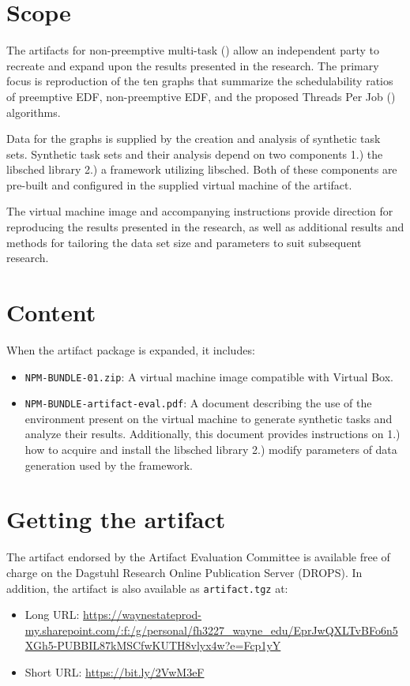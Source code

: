\documentclass[a4paper,USenglish,english]{darts-v2018}
\newenvironment{scope}{\section{Scope}}{}
\newenvironment{content}{\section{Content}}{}
\newenvironment{getting}{\section{Getting the artifact} The artifact 
endorsed by the Artifact Evaluation Committee is available free of 
charge on the Dagstuhl Research Online Publication Server (DROPS).}{}
\begin{document}
\begin{scope}
  The artifacts for non-preemptive multi-task \bundle{} (\npmbundle{})
allow an independent party to recreate and expand upon the results
presented in the research. The primary focus is reproduction of the
ten graphs that summarize the schedulability ratios of preemptive EDF,
non-preemptive EDF, and the proposed Threads Per Job (\tpj{})
algorithms.

  Data for the graphs is supplied by the creation and analysis of
synthetic task sets. Synthetic task sets and their analysis depend on
two components 1.) the libsched library 2.) a framework utilizing
libsched. Both of these components are pre-built and configured in the
supplied virtual machine of the artifact.

  The virtual machine image and accompanying instructions provide
direction for reproducing the results presented in the research, as
well as additional results and methods for tailoring the data set size
and parameters to suit subsequent research.

\end{scope}

\begin{content}
When the artifact package is expanded, it includes:
\begin{itemize}
\item \texttt{NPM-BUNDLE-01.zip}: A virtual machine image compatible
  with Virtual Box.
\item \texttt{NPM-BUNDLE-artifact-eval.pdf}: A document describing the
  use of the environment present on the virtual machine to generate
  synthetic tasks and analyze their results. Additionally, this
  document provides instructions on 1.) how to acquire and install the
  libsched library 2.) modify parameters of data generation used by
  the framework.
\end{itemize}
\end{content}

\begin{getting}
  In addition, the artifact is also available as \texttt{artifact.tgz}
  at:
  \begin{itemize}
    \item Long URL: \url{https://waynestateprod-my.sharepoint.com/:f:/g/personal/fh3227\_wayne\_edu/EprJwQXLTvBFo6n5XGh5-PUBBIL87kMSCfwKUTH8vlyx4w?e=Fcp1yY} 
    \item Short URL: \url{https://bit.ly/2VwM3eF}
  \end{itemize}
\end{getting}
\end{document}
